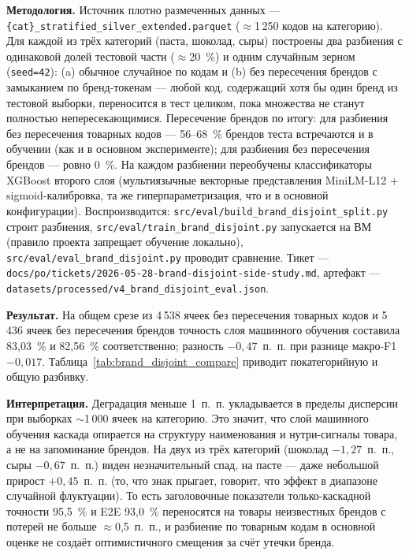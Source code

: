 \textbf{Методология.} Источник плотно размеченных данных --- \texttt{\{cat\}\_stratified\_silver\_extended.parquet} ($\approx$1\,250 кодов на категорию). Для каждой из трёх категорий (паста, шоколад, сыры) построены два разбиения с одинаковой долей тестовой части ($\approx$20~\%) и одним случайным зерном (\texttt{seed=42}): (a) обычное случайное по кодам и (b) без пересечения брендов с замыканием по бренд-токенам --- любой код, содержащий хотя бы один бренд из тестовой выборки, переносится в тест целиком, пока множества не станут полностью непересекающимися. Пересечение брендов по итогу: для разбиения без пересечения товарных кодов --- 56--68~\% брендов теста встречаются и в обучении (как и в основном эксперименте); для разбиения без пересечения брендов --- ровно 0~\%. На каждом разбиении переобучены классификаторы XGBoost второго слоя (мультиязычные векторные представления MiniLM-L12 + sigmoid-калибровка, та же гиперпараметризация, что и в основной конфигурации). Воспроизводится: \texttt{src/eval/build\_brand\_disjoint\_split.py} строит разбиения, \texttt{src/eval/train\_brand\_disjoint.py} запускается на ВМ (правило проекта запрещает обучение локально), \texttt{src/eval/eval\_brand\_disjoint.py} проводит сравнение. Тикет --- \texttt{docs/po/tickets/2026-05-28-brand-disjoint-side-study.md}, артефакт --- \texttt{datasets/processed/v4\_brand\_disjoint\_eval.json}.

\textbf{Результат.} На общем срезе из 4\,538 ячеек без пересечения товарных кодов и 5\,436 ячеек без пересечения брендов точность слоя машинного обучения составила 83,03~\% и 82,56~\% соответственно; разность $-0{,}47$~п.~п. при разнице макро-F1 $-0{,}017$. Таблица~\ref{tab:brand_disjoint_compare} приводит покатегорийную и общую разбивку.



\textbf{Интерпретация.} Деградация меньше 1~п.~п. укладывается в пределы дисперсии при выборках $\sim$1\,000 ячеек на категорию. Это значит, что слой машинного обучения каскада опирается на структуру наименования и нутри-сигналы товара, а не на запоминание брендов. На двух из трёх категорий (шоколад $-1{,}27$~п.~п., сыры $-0{,}67$~п.~п.) виден незначительный спад, на пасте --- даже небольшой прирост $+0{,}45$~п.~п. (то, что знак прыгает, говорит, что эффект в диапазоне случайной флуктуации). То есть заголовочные показатели только-каскадной точности 95,5~\% и E2E 93,0~\% переносятся на товары неизвестных брендов с потерей не больше $\approx$0,5~п.~п., и разбиение по товарным кодам в основной оценке не создаёт оптимистичного смещения за счёт утечки бренда.

